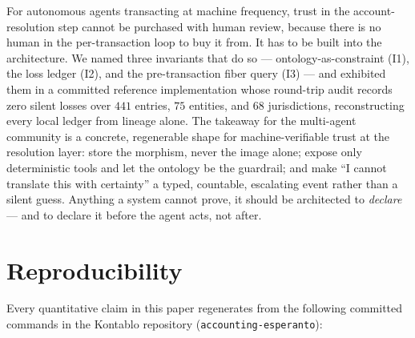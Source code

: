 \documentclass[11pt]{clapps}  %
\begin{document}
For autonomous agents transacting at machine frequency, trust in the
account-resolution step cannot be purchased with human review, because there is
no human in the per-transaction loop to buy it from. It has to be built into the
architecture. We named three invariants that do so --- ontology-as-constraint
(I1), the loss ledger (I2), and the pre-transaction fiber query (I3) --- and
exhibited them in a committed reference implementation whose round-trip audit
records zero silent losses over $441$ entries, $75$ entities, and $68$
jurisdictions, reconstructing every local ledger from lineage alone. The
takeaway for the multi-agent community is a concrete, regenerable shape for
machine-verifiable trust at the resolution layer: store the morphism, never the
image alone; expose only deterministic tools and let the ontology be the
guardrail; and make ``I cannot translate this with certainty'' a typed,
countable, escalating event rather than a silent guess. Anything a system cannot
prove, it should be architected to \emph{declare} --- and to declare it before
the agent acts, not after.

\section*{Reproducibility}

Every quantitative claim in this paper regenerates from the following committed
commands in the Kontablo repository (\texttt{accounting-esperanto}):
\end{document}
